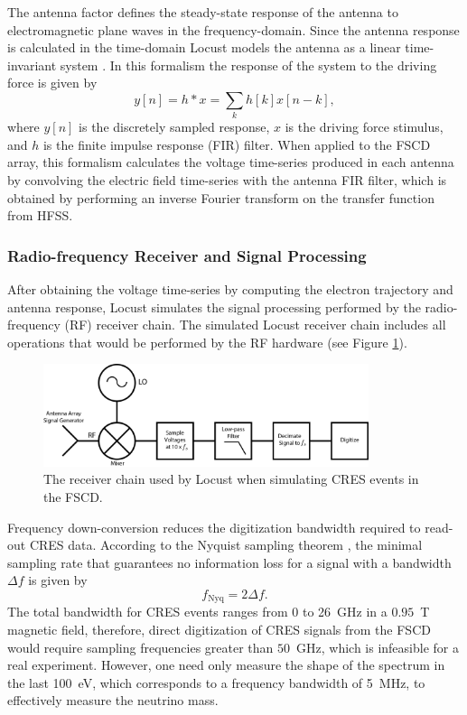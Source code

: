 The antenna factor defines the steady-state response of the antenna to electromagnetic plane waves in the frequency-domain. Since the antenna response is calculated in the time-domain Locust models the antenna as a linear time-invariant system \cite{lti_theory_wiki}. In this formalism the response of the system to the driving force is given by 
\begin{equation}
    y[n] = h\ast x=\sum_{k}{h[k]x[n-k]},
\end{equation}
where $y[n]$ is the discretely sampled response, $x$ is the driving force stimulus, and $h$ is the finite impulse response (FIR) filter. When applied to the FSCD array, this formalism calculates the voltage time-series produced in each antenna by convolving the electric field time-series with the antenna FIR filter, which is obtained by performing an inverse Fourier transform on the transfer function from HFSS. 

\subsubsection*{Radio-frequency Receiver and Signal Processing}

After obtaining the voltage time-series by computing the electron trajectory and antenna response, Locust simulates the signal processing performed by the radio-frequency (RF) receiver chain. The simulated Locust receiver chain includes all operations that would be performed by the RF hardware (see Figure \ref{fig:chap4-locust-receiver-chain}). 

\begin{figure}[htbp]
    \centering
    \includegraphics[width=0.85\textwidth]{figs/Chapter-4/230511_locust_receiver_chain.png}
    \caption{The receiver chain used by Locust when simulating CRES events in the FSCD.}
\label{fig:chap4-locust-receiver-chain}
\end{figure}

Frequency down-conversion reduces the digitization bandwidth required to read-out CRES data. According to the Nyquist sampling theorem \cite{nyquist_sampling}, the minimal sampling rate that guarantees no information loss for a signal with a bandwidth $\Delta f$ is given by
\begin{equation}
    f_{\textrm{Nyq}}=2\Delta f.
\end{equation}
The total bandwidth for CRES events ranges from 0 to 26~GHz in a $0.95$~T magnetic field, therefore, direct digitization of CRES signals from the FSCD would require sampling frequencies greater than $50$~GHz, which is infeasible for a real experiment. However, one need only measure the shape of the spectrum in the last 100~eV, which corresponds to a frequency bandwidth of 5~MHz, to effectively measure the neutrino mass. 

